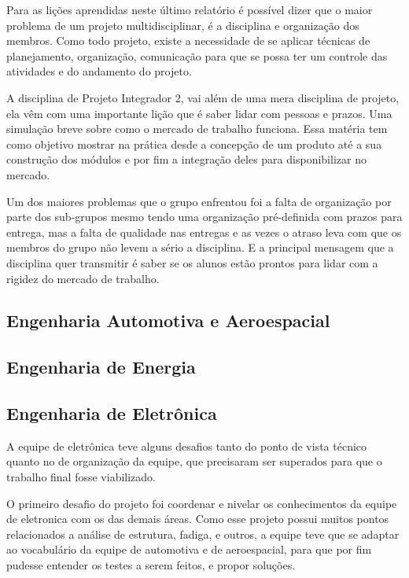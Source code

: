 Para as lições aprendidas neste último relatório é possível dizer que o maior problema de um projeto multidisciplinar, é a disciplina e organização dos membros. Como todo projeto, existe a necessidade de se aplicar técnicas de planejamento, organização, comunicação para que se possa ter um controle das atividades e do andamento do projeto.

A disciplina de Projeto Integrador 2, vai além de uma mera disciplina de projeto, ela vêm com uma importante lição que é saber lidar com pessoas e prazos. Uma simulação breve sobre como o mercado de trabalho funciona. Essa matéria tem como objetivo mostrar na prática desde a concepção de um produto até a sua construção dos módulos e por fim a integração deles para disponibilizar no mercado.

Um dos maiores problemas que o grupo enfrentou foi a falta de organização por parte dos sub-grupos mesmo tendo uma organização pré-definida com prazos para entrega, mas a falta de qualidade nas entregas e as vezes o atraso leva com que os membros do grupo não levem a sério a disciplina. E a principal mensagem que a disciplina quer transmitir é saber se os alunos estão prontos para lidar com a rigidez do mercado de trabalho.

\subsection*{Engenharia Automotiva e Aeroespacial}

\subsection*{Engenharia de Energia}

\subsection*{Engenharia de Eletrônica}

A equipe de eletrônica teve alguns desafios tanto do ponto de vista técnico quanto no de organização da equipe, que precisaram ser superados para que o trabalho final fosse viabilizado.

O primeiro desafio do projeto foi coordenar e nivelar os conhecimentos da equipe de eletronica com os das demais áreas. Como esse projeto possui muitos pontos relacionados a análise de estrutura, fadiga, e outros, a equipe teve que se adaptar ao vocabulário da equipe de automotiva e de aeroespacial, para que por fim pudesse entender os testes a serem feitos, e propor soluções.

